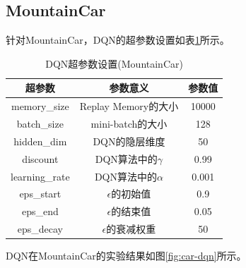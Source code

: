 \documentclass[a4paper,UTF8]{article}
\theoremstyle{definition}
\begin{document}
\subsection*{MountainCar}

针对MountainCar，DQN的超参数设置如表\ref{tab:car-dqn}所示。

\begin{table}[H]
	\centering
	\begin{tabular}{ccc}
		\toprule
		超参数 & 参数意义 & 参数值 \\
		\midrule
		memory\_size & Replay Memory的大小 & 10000 \\
		batch\_size & mini-batch的大小 & 128 \\
		hidden\_dim & DQN的隐层维度 & 50 \\
		discount & DQN算法中的$\gamma$ & 0.99 \\
		learning\_rate & DQN算法中的$\alpha$ & 0.001 \\
		eps\_start & $\epsilon$的初始值 & 0.9 \\
		eps\_end & $\epsilon$的结束值 & 0.05 \\
		eps\_decay & $\epsilon$的衰减权重 & 50 \\
		\bottomrule
	\end{tabular}
	\caption{DQN超参数设置(MountainCar)}\label{tab:car-dqn}
\end{table}

DQN在MountainCar的实验结果如图\ref{fig:car-dqn}所示。
\end{document}
